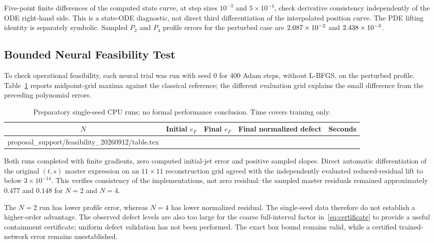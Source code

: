 \documentclass[11pt,a4paper]{article}
\makeatletter
\theoremstyle{definition}
\theoremstyle{remark}
\let\tableinput\@@input
\makeatother
\begin{document}
Five-point finite differences of the computed state curve, at step sizes $10^{-3}$ and $5\times10^{-4}$, check derivative consistency independently of the ODE right-hand side. This is a state-ODE diagnostic, not direct third differentiation of the interpolated position curve. The PDE lifting identity is separately symbolic. Sampled $P_2$ and $P_4$ profile errors for the perturbed case are $2.087\times10^{-2}$ and $2.438\times10^{-3}$.

\subsection{Bounded Neural Feasibility Test}
To check operational feasibility, each neural trial was run with seed 0 for 400 Adam steps, without L-BFGS, on the perturbed profile. Table~\ref{tab:smoke} reports midpoint-grid maxima against the classical reference; the different evaluation grid explains the small difference from the preceding polynomial errors.
\begin{table}[htbp]
\centering
\caption{Preparatory single-seed CPU runs; no formal performance conclusion. Time covers training only.}\label{tab:smoke}
\begin{tabular}{ccccc}
\toprule
$N$ & Initial $e_F$ & Final $e_F$ & Final normalized defect & Seconds\\
\midrule
\tableinput proposal_support/feasibility_20260912/table.tex
\bottomrule
\end{tabular}
\end{table}

Both runs completed with finite gradients, zero computed initial-jet error and positive sampled slopes. Direct automatic differentiation of the original $(t,s)$ master expression on an $11\times11$ reconstruction grid agreed with the independently evaluated reduced-residual lift to below $3\times10^{-14}$. This verifies consistency of the implementations, not zero residual: the sampled master residuals remained approximately $0.477$ and $0.148$ for $N=2$ and $N=4$.

The $N=2$ run has lower profile error, whereas $N=4$ has lower normalized residual. The single-seed data therefore do not establish a higher-order advantage. The observed defect levels are also too large for the coarse full-interval factor in~\eqref{eq:certificate} to provide a useful containment certificate; uniform defect validation has not been performed. The exact box bound remains valid, while a certified trained-network error remains unestablished.
\end{document}
